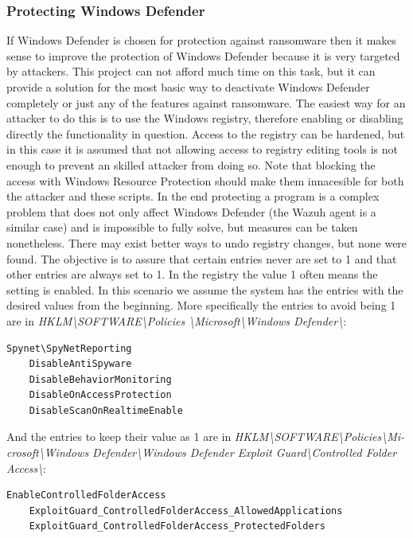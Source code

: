 \subsubsection{Protecting Windows Defender}
If Windows Defender is chosen for protection against ransomware then it makes sense to improve the protection of Windows Defender because it is very targeted by attackers.
This project can not afford much time on this task, but it can provide a solution for the most basic way to deactivate Windows Defender completely or just any of the features against ransomware.
The easiest way for an attacker to do this is to use the Windows registry, therefore enabling or disabling directly the functionality in question.
\linej
Access to the registry can be hardened, but in this case it is assumed that not allowing access to registry editing tools is not enough to prevent an skilled attacker from doing so.
Note that blocking the access with Windows Resource Protection should make them innacesible for both the attacker and these scripts.
\linej
In the end protecting a program is a complex problem that does not only affect Windows Defender (the Wazuh agent is a similar case) and is impossible to fully solve, but measures can be taken nonetheless.
\linej
\linej
There may exist better ways to undo registry changes, but none were found.
The objective is to assure that certain entries never are set to 1 and that other entries are always set to 1.
In the registry the value 1 often means the setting is enabled.
In this scenario we assume the system has the entries with the desired values from the beginning.
\linej
More specifically the entries to avoid being 1 are in \textit{HKLM{\textbackslash}SOFTWARE{\textbackslash}Policies {\textbackslash}Microsoft{\textbackslash}Windows Defender{\textbackslash}}:
\begin{lstlisting}[style=xml,frame=none]
	Spynet\SpyNetReporting
	DisableAntiSpyware
	DisableBehaviorMonitoring
	DisableOnAccessProtection
	DisableScanOnRealtimeEnable
\end{lstlisting}
\linej
And the entries to keep their value as 1 are in \textit{HKLM{\textbackslash}SOFTWARE{\textbackslash}Policies{\textbackslash}Mi- crosoft{\textbackslash}Windows Defender{\textbackslash}Windows Defender Exploit Guard{\textbackslash}Controlled Folder Access{\textbackslash}}:
\begin{lstlisting}[style=xml,frame=none]
	EnableControlledFolderAccess
	ExploitGuard_ControlledFolderAccess_AllowedApplications
	ExploitGuard_ControlledFolderAccess_ProtectedFolders
\end{lstlisting}
